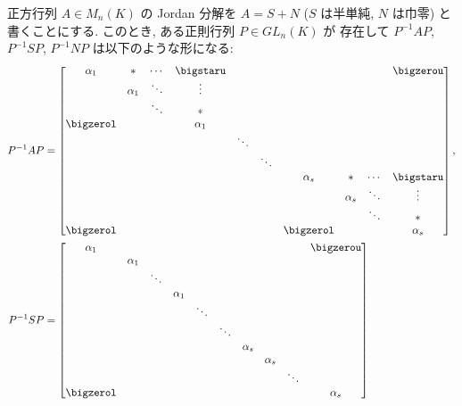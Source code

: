\documentclass[12pt,twoside]{jarticle}
\begin{document}
\begin{question}
\label{q:Jordan-decomp-3}
  正方行列 $A \in M_n(K)$ の Jordan 分解を $A=S+N$ ($S$ は半単純, $N$ は巾零) 
  と書くことにする.  このとき, ある正則行列 $P\in GL_n(K)$ が
  存在して $P^{-1}AP$, $P^{-1}SP$, $P^{-1}NP$ は以下のような形になる:
  {\small
  \begin{align*}
    P^{-1}AP &=
    \begin{bmatrix}
      \alpha_1  & *        & \cdots & \bigstaru & & & & & & \bigzerou \\
                & \alpha_1 & \ddots & \vdots    & & & & & & \\
                &          & \ddots & *         & & & & & & \\
      \bigzerol &          &        & \alpha_1  & & & & & & \\
                & & & & \ddots & & & & \\
                & & & & & \ddots & & & \\
                & & & & & & \alpha_s  & *        & \cdots & \bigstaru \\
                & & & & & &           & \alpha_s & \ddots & \vdots \\
                & & & & & &           &          & \ddots & * \\
      \bigzerol & & & & & & \bigzerol &          &        & \alpha_s \\
    \end{bmatrix},
    \\
    P^{-1}SP &=
    \begin{bmatrix}
      \alpha_1  &          &        &           & & & & & & \bigzerou \\
                & \alpha_1 &        &           & & & & & & \\
                &          & \ddots &           & & & & & & \\
                &          &        & \alpha_1  & & & & & & \\
                & & & & \ddots & & & & \\
                & & & & & \ddots & & & \\
                & & & & & & \alpha_s  &          &        & \\
                & & & & & &           & \alpha_s &        & \\
                & & & & & &           &          & \ddots & \\
      \bigzerol & & & & & &           &          &        & \alpha_s \\

\end{bmatrix}
\end{align*}}
\end{question}
\end{document}
